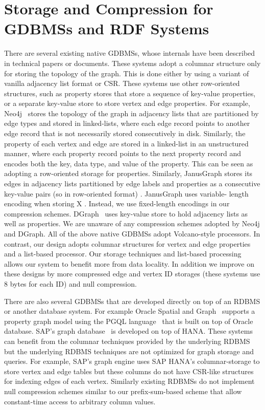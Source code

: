\section{Storage and Compression for GDBMSs and RDF Systems}
\label{sec:gdbms-storage-and-compression}

There are several existing native GDBMSs, whose internals have been described in technical papers or documents. These systems adopt a columnar structure only for storing the topology of the graph. This is done either by using a variant of vanilla adjacency list format or CSR. These systems use other row-oriented structures, such as property stores that store a sequence of key-value properties, or a separate key-value store to store vertex and edge properties. 
For example, Neo4j~\cite{neo4j} stores the topology of the graph in adjacency lists that are partitioned by edge types and stored in linked-lists, where each edge record points to another edge record that is not necessarily stored consecutively in disk. Similarly, the property of each vertex and edge are stored in a linked-list in an unstructured manner, where each property record points to the next property record and encodes both the key, data type, and value of the property. This can be seen as adopting a row-oriented storage for properties. Similarly, JanusGraph \cite{janusgraph} stores its edges in adjacency lists partitioned by edge labels and properties as a consecutive  key-value pairs (so in row-oriented format) . JanusGraph uses variable- length encoding when storing X . Instead, we use fixed-length encodings in our compression schemes. DGraph~\cite{dgraph} uses 
key-value store to hold adjacency lists as well as properties.  We are unaware of any compression schemes adopted by Neo4j and DGraph. All of the above native GDBMSs adopt Volcano-style processors. In contrast, our design adopts columnar structures for vertex and edge properties and a list-based processor. Our storage techniques and list-based processing allows our system to benefit more from data locality. In addition we improve on these designs by more compressed edge and vertex ID storages (these systems use 8 bytes for each ID) and null compression.

There are also several GDBMSs that are developed directly on top of an RDBMS or another database system. For example Oracle Spatial and Graph~\cite{oracle-spatial-and-graph} supports a property graph model using the PGQL language~\cite{pgql} that is built on top of Oracle database. SAP's graph database~\cite{sap-graph-story} is developed on top of HANA. These systems can benefit from the columnar techniques provided by the underlying RDBMS but the underlying RDBMS techniques are not optimized for graph storage and queries. For example, SAP's graph engine uses SAP HANA's columnar-storage to store vertex and edge tables but these columns do not have CSR-like structures for indexing edges of each vertex. Similarly existing RDBMSs do not implement null compression schemes similar to our prefix-sum-based scheme that allow constant-time access to arbitrary column values.

